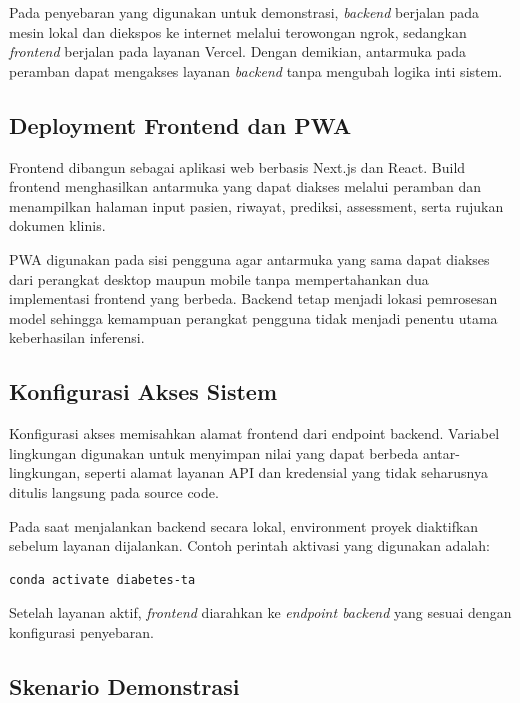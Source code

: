 Pada penyebaran yang digunakan untuk demonstrasi, \textit{backend} berjalan pada mesin lokal dan diekspos ke internet melalui terowongan ngrok, sedangkan
\textit{frontend} berjalan pada layanan Vercel. Dengan demikian, antarmuka pada peramban dapat mengakses layanan \textit{backend} tanpa mengubah logika inti sistem.

\subsection{Deployment Frontend dan PWA}
\label{subsec:bab5-deployment-frontend-pwa}

Frontend dibangun sebagai aplikasi web berbasis Next.js dan React. Build frontend menghasilkan antarmuka yang dapat diakses melalui peramban dan menampilkan
halaman input pasien, riwayat, prediksi, assessment, serta rujukan dokumen klinis.

PWA digunakan pada sisi pengguna agar antarmuka yang sama dapat diakses dari perangkat desktop maupun mobile tanpa mempertahankan dua implementasi frontend
yang berbeda. Backend tetap menjadi lokasi pemrosesan model sehingga kemampuan perangkat pengguna tidak menjadi penentu utama keberhasilan inferensi.

\subsection{Konfigurasi Akses Sistem}
\label{subsec:bab5-konfigurasi-akses-sistem}

Konfigurasi akses memisahkan alamat frontend dari endpoint backend. Variabel lingkungan digunakan untuk menyimpan nilai yang dapat berbeda antar-lingkungan,
seperti alamat layanan API dan kredensial yang tidak seharusnya ditulis langsung pada source code.

Pada saat menjalankan backend secara lokal, environment proyek diaktifkan sebelum layanan dijalankan. Contoh perintah aktivasi yang digunakan adalah:

\begin{verbatim}
conda activate diabetes-ta
\end{verbatim}

Setelah layanan aktif, \textit{frontend} diarahkan ke \textit{endpoint backend} yang sesuai dengan konfigurasi penyebaran.

\subsection{Skenario Demonstrasi}
\label{subsec:bab5-skenario-demonstrasi}

